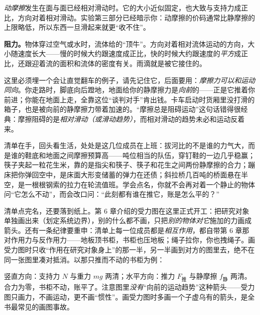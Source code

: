 \emph{动摩擦}发生在面与面已经相对滑动时。它的大小近似固定，也大致与支持力成正比，方向对着相对滑动。实验第三部分已经暗示你：动摩擦的价码通常比静摩擦的上限略低，所以东西一旦滑起来就更“收不住”。

\textbf{阻力。}物体穿过空气或水时，流体给的“顶牛”。方向对着相对流体运动的方向，大小随速度长大——慢的时候大约跟速度成正比，快的时候大约跟速度的\emph{平方}成正比，还跟迎着流的面积和流体的密度有关。雨滴就是被它接住的。

这里必须埋一个会让直觉翻车的例子，请先记住它，后面要用：\emph{摩擦力可以和运动同向}。你走路时，脚底向后蹬地，地面给你的静摩擦力是\emph{向前}的——正是它推着你前进；你能在地面上走，全靠这位“谈判对手”肯出钱。卡车启动时货厢里没打滑的箱子，也是被向前的静摩擦力带着加速的。“摩擦总是阻碍运动”这句话错得很经典：摩擦阻碍的是\emph{相对滑动（或滑动趋势）}，而相对滑动的趋势未必和运动反着来。

清单在手，回头看生活，处处是这几位成员在上班：拔河比的不是谁的力气大，而是谁的鞋底和地面之间摩擦预算高——吨位相当的队伍，穿钉鞋的一边几乎稳赢；筷子夹起一粒花生米，靠的是指尖和筷子、筷子和花生之间两份静摩擦的合力；蹦床把你弹回空中，是床面大形变储蓄的弹力在还债；斜拉桥几百吨的桥面悬在半空，是一根根钢索的拉力在轮流值班。学会点名，你就不会再对着一个静止的物体问“它怎么不动”，而会改口问：“此刻都有谁在推它，账是怎么平的？”

清单点完名，还要落到纸上。第 6 章介绍的受力图在这里正式开工：把研究对象单独画出来（划定系统边界），别的什么都不画，只把\emph{别的物体对它}施加的力画成箭头。还有一条纪律要重申：清单上每一位成员都是\emph{相互作用}，都自带第 6 章那对作用力与反作用力——地板顶书柜，书柜也压地板；绳子拉你，你也拽绳子。画受力图时只收“作用在研究对象身上”的那一半，另一半画到对方的图里去，绝不在同一张图里凑对抵消。以那只推而不动的书柜为例：

\begin{center}
\end{center}

竖直方向：支持力 \(N\) 与重力 \(mg\) 两清；水平方向：推力 \(F_{\text{推}}\) 与静摩擦 \(f_{\text{静}}\) 两清。合力为零，书柜不动，账平了。注意图里\emph{没有}“向前的运动趋势”这种箭头——受力图只画力，不画运动，更不画“惯性”。画受力图时多画一个子虚乌有的箭头，是全书最常见的画图事故。

